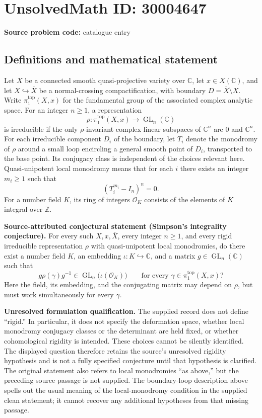 \documentclass[11pt]{article}
\newcommand{\Z}{\mathbb{Z}}
\newcommand{\C}{\mathbb{C}}
\begin{document}
\section*{UnsolvedMath ID: 30004647}
\textbf{Source problem code:} catalogue entry
\subsection{Definitions and mathematical statement}
Let \(X\) be a connected smooth quasi-projective variety over \(\C\), let \(x\in X(\C)\), and let \(X\hookrightarrow\overline X\) be a normal-crossing compactification, with boundary \(D=\overline X\setminus X\). Write \(\pi_1^{\mathrm{top}}(X,x)\) for the fundamental group of the associated complex analytic space. For an integer \(n\geq 1\), a representation
\[
\rho:\pi_1^{\mathrm{top}}(X,x)\longrightarrow\operatorname{GL}_n(\C)
\]
is irreducible if the only \(\rho\)-invariant complex linear subspaces of \(\C^n\) are \(0\) and \(\C^n\). For each irreducible component \(D_i\) of the boundary, let \(T_i\) denote the monodromy of \(\rho\) around a small loop encircling a general smooth point of \(D_i\), transported to the base point. Its conjugacy class is independent of the choices relevant here. Quasi-unipotent local monodromy means that for each \(i\) there exists an integer \(m_i\geq 1\) such that
\[
(T_i^{m_i}-I_n)^n=0.
\]
For a number field \(K\), its ring of integers \(\mathcal O_K\) consists of the elements of \(K\) integral over \(\Z\).

\textbf{Source-attributed conjectural statement (Simpson's integrality conjecture).} For every such \(X,x,\overline X\), every integer \(n\geq 1\), and every rigid irreducible representation \(\rho\) with quasi-unipotent local monodromies, do there exist a number field \(K\), an embedding \(\iota:K\hookrightarrow\C\), and a matrix \(g\in\operatorname{GL}_n(\C)\) such that
\[
g\rho(\gamma)g^{-1}\in\operatorname{GL}_n\bigl(\iota(\mathcal O_K)\bigr)
\qquad\text{for every }\gamma\in\pi_1^{\mathrm{top}}(X,x)?
\]
Here the field, its embedding, and the conjugating matrix may depend on \(\rho\), but must work simultaneously for every \(\gamma\).

\textbf{Unresolved formulation qualification.} The supplied record does not define ``rigid.'' In particular, it does not specify the deformation space, whether local monodromy conjugacy classes or the determinant are held fixed, or whether cohomological rigidity is intended. These choices cannot be silently identified. The displayed question therefore retains the source's unresolved rigidity hypothesis and is not a fully specified conjecture until that hypothesis is clarified. The original statement also refers to local monodromies ``as above,'' but the preceding source passage is not supplied. The boundary-loop description above spells out the usual meaning of the local-monodromy condition in the supplied clean statement; it cannot recover any additional hypotheses from that missing passage.
\end{document}
